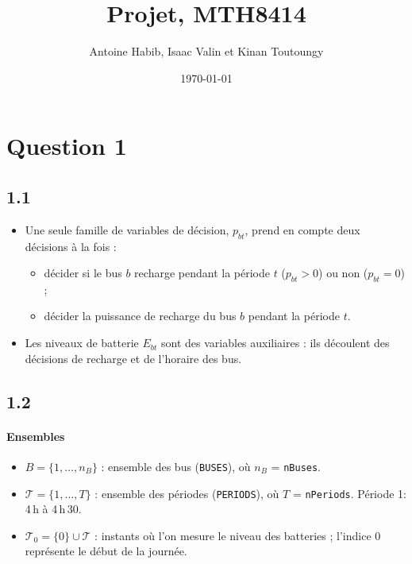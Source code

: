 \documentclass{article}
\title{Projet, MTH8414}
\author{Antoine Habib, Isaac Valin et Kinan Toutoungy}
\date{\today}
\begin{document}
\maketitle

\section*{Question 1}

\subsection*{1.1}
\begin{itemize}
  \item Une seule famille de variables de décision, $p_{bt}$, prend en compte deux décisions à la fois :
  \begin{itemize}
    \item décider si le bus $b$ recharge pendant la période $t$ ($p_{bt} > 0$) ou non ($p_{bt} = 0$) ;
    \item décider la puissance de recharge du bus $b$ pendant la période $t$.
  \end{itemize}
  \item Les niveaux de batterie $E_{bt}$ sont des variables auxiliaires : ils découlent des décisions de recharge et de l'horaire des bus.
\end{itemize}

\subsection*{1.2}
\paragraph{Ensembles}
\begin{itemize}
  \item $B = \{1, \dots, n_B\}$ : ensemble des bus (\texttt{BUSES}), où $n_B$ = \texttt{nBuses}.
  \item $\mathcal{T} = \{1, \dots, T\}$ : ensemble des périodes (\texttt{PERIODS}), où $T$ = \texttt{nPeriods}. Période 1: 4\,h à 4\,h\,30.
  \item $\mathcal{T}_0 = \{0\} \cup \mathcal{T}$ : instants où l'on mesure le niveau des batteries ; l'indice 0 représente le début de la journée.
\end{itemize}
\end{document}
